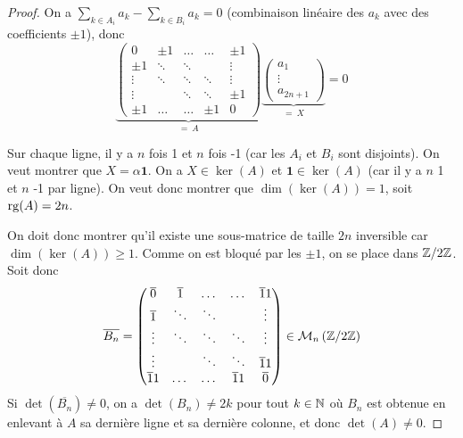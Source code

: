 \documentclass[12pt]{article}
\begin{document}
\begin{proof}
    On a $\sum_{k\in A_{i}}a_{k}-\sum_{k\in B_{i}}a_{k}=0$ (combinaison linéaire des $a_{k}$ avec des coefficients $\pm1$), donc 
    \begin{equation}
        \underbrace{
            \begin{pmatrix}
                0 & \pm 1&\dots&\dots&\pm1\\
                \pm 1&\ddots&\ddots&&\vdots\\
                \vdots&\ddots&\ddots&\ddots&\vdots\\
                \vdots&&\ddots&\ddots&\pm1\\
                \pm1&\dots&\dots&\pm1&0
            \end{pmatrix}
        }_{=~A}
        \underbrace{
            \begin{pmatrix}
                a_{1}\\
                \vdots\\
                a_{2n+1}
            \end{pmatrix}
        }_{=~X}=0
    \end{equation}

    Sur chaque ligne, il y a $n$ fois 1 et $n$ fois -1 (car les $A_{i}$ et $B_{i}$ sont disjoints). On veut montrer que $X=\alpha\bm{1}$. On a $X\in\ker(A)$ et $\bm{1}\in\ker(A)$ (car il y a $n$ 1 et $n$ -1 par ligne). On veut donc montrer que $\dim(\ker(A))=1$, soit $\operatorname{rg}(A)=2n$.

    On doit donc montrer qu'il existe une sous-matrice de taille $2n$ inversible car $\dim(\ker(A))\geqslant1$. Comme on est bloqué par les $\pm1$, on se place dans $\mathbb{Z}/2\mathbb{Z}$. Soit donc 
    \begin{equation}
        \overline{B_{n}}=
        \begin{pmatrix}
            \overline{0} & \overline{1}&\dots&\dots&\overline{1}1\\
            \overline{1}&\ddots&\ddots&&\vdots\\
            \vdots&\ddots&\ddots&\ddots&\vdots\\
            \vdots&&\ddots&\ddots&\overline{1}1\\
            \overline{1}1&\dots&\dots&\overline{1}1&\overline{0}
        \end{pmatrix}\in\mathcal{M}_{n}\left(\mathbb{Z}/2\mathbb{Z}\right)
    \end{equation}
    Si $\det(\overline{B_{n}})\neq0$, on a $\det(B_{n})\neq 2k$ pour tout $k\in\mathbb{N}$ où $B_{n}$ est obtenue en enlevant à $A$ sa dernière ligne et sa dernière colonne, et donc $\det(A)\neq0$.


\end{proof}
\end{document}
